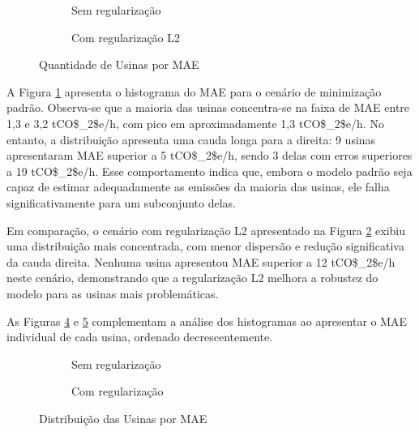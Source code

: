 \begin{figure}[H]
    \centering
    \begin{subfigure}{0.6\textwidth}
        \centering
        
        \caption{Sem regularização}\label{fig:hist_padrao}
    \end{subfigure}
    
    \vspace{0.5cm}
    
    \begin{subfigure}{0.6\textwidth}
        \centering
        
        \caption{Com regularização L2}\label{fig:hist_L2}
    \end{subfigure}
    \caption{Quantidade de Usinas por MAE}\label{fig:histograma}
\end{figure}

A Figura \ref{fig:hist_padrao} apresenta o histograma do \ac{MAE} para o cenário de minimização padrão. Observa-se que a maioria das usinas concentra-se na faixa de \ac{MAE} entre 1,3 e 3,2 \ac{tCO$_2$e}/h, com pico em aproximadamente 1,3 \ac{tCO$_2$e}/h. No entanto, a distribuição apresenta uma cauda longa para a direita: 9 usinas apresentaram \ac{MAE} superior a 5 \ac{tCO$_2$e}/h, sendo 3 delas com erros superiores a 19 \ac{tCO$_2$e}/h. Esse comportamento indica que, embora o modelo padrão seja capaz de estimar adequadamente as emissões da maioria das usinas, ele falha significativamente para um subconjunto delas.

Em comparação, o cenário com regularização L2 apresentado na Figura \ref{fig:hist_L2} exibiu uma distribuição mais concentrada, com menor dispersão e redução significativa da cauda direita. Nenhuma usina apresentou \ac{MAE} superior a 12 \ac{tCO$_2$e}/h neste cenário, demonstrando que a regularização L2 melhora a robustez do modelo para as usinas mais problemáticas.

As Figuras \ref{fig:dist_padrao} e \ref{fig:dist_L2} complementam a análise dos histogramas ao apresentar o \ac{MAE} individual de cada usina, ordenado decrescentemente.

\begin{figure}[H]
    \centering
    \begin{subfigure}{0.6\textwidth}
        \centering
        
        \caption{Sem regularização}
        \label{fig:dist_padrao}
    \end{subfigure}
    
    \vspace{0.5cm}
    
    \begin{subfigure}{0.6\textwidth}
        \centering
        
        \caption{Com regularização}
        \label{fig:dist_L2}
    \end{subfigure}
    \caption{Distribuição das Usinas por MAE}
    \label{fig:distr_mae}
\end{figure}

